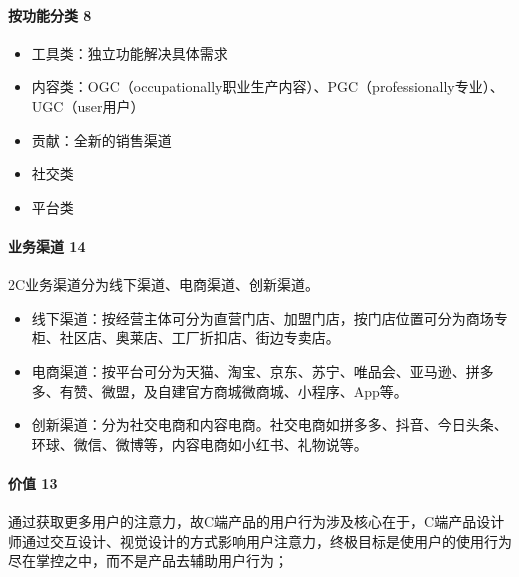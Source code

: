 \documentclass[letterpaper,10pt,english]{sphinxmanual}
\begin{document}
\paragraph{按功能分类 8\sphinxfootnotemark[102]}
\label{\detokenize{chapter_introduction/2C:id3}}%
\begin{footnotetext}[102]\sphinxAtStartFootnote
{}
%
\end{footnotetext}\ignorespaces \begin{itemize}
\item {} 
工具类：独立功能解决具体需求

\item {} 
内容类：OGC（occupationally职业生产内容）、PGC（professionally专业）、UGC（user用户）

\item {} 
贡献：全新的销售渠道

\item {} 
社交类

\item {} 
平台类

\end{itemize}


\paragraph{业务渠道 14\sphinxfootnotemark[103]}
\label{\detokenize{chapter_introduction/2C:id4}}%
\begin{footnotetext}[103]\sphinxAtStartFootnote
{}
%
\end{footnotetext}\ignorespaces 
2C业务渠道分为线下渠道、电商渠道、创新渠道。
\begin{itemize}
\item {} 
线下渠道：按经营主体可分为直营门店、加盟门店，按门店位置可分为商场专柜、社区店、奥莱店、工厂折扣店、街边专卖店。

\item {} 
电商渠道：按平台可分为天猫、淘宝、京东、苏宁、唯品会、亚马逊、拼多多、有赞、微盟，及自建官方商城微商城、小程序、App等。

\item {} 
创新渠道：分为社交电商和内容电商。社交电商如拼多多、抖音、今日头条、环球、微信、微博等，内容电商如小红书、礼物说等。

\end{itemize}


\paragraph{价值 13\sphinxfootnotemark[104]}
\label{\detokenize{chapter_introduction/2C:id5}}%
\begin{footnotetext}[104]\sphinxAtStartFootnote
{}
%
\end{footnotetext}\ignorespaces 
通过获取更多用户的注意力，故C端产品的用户行为涉及核心在于，C端产品设计师通过交互设计、视觉设计的方式影响用户注意力，终极目标是使用户的使用行为尽在掌控之中，而不是产品去辅助用户行为；
\end{document}
